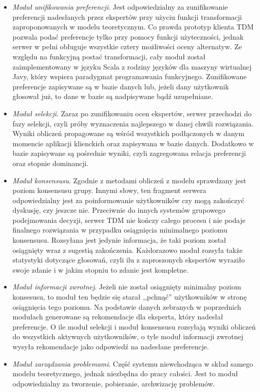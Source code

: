 \begin{itemize}
  \item \emph{Moduł unifikowania preferencji}. Jest odpowiedzialny za
  zunifikowanie preferencji nadesłanych przez ekspertów przy użyciu funkcji
  transformacji zaproponowanych w modelu teoretycznym. Co prawda prototyp
  klienta TDM pozwala podać preferencje tylko przy pomocy funkcji użyteczności,
  jednak serwer w pełni obługuje wszystkie cztery możliwości oceny alternatyw.
  Ze względu na funkcyjną postać transformacji, cały moduł został
  zaimplementowany w języku Scala z rodziny języków dla maszyny wirtualnej Javy,
  który wspiera paradygmat programawania funkcyjnego. Zunifikowane preferencje
  zapisywane są w bazie danych lub, jeżeli dany użytkownik głosował już, to dane
  w bazie są nadpisywane bądź uzupełniane.

  \item \emph{Moduł selekcji}. Zaraz po zunifikowaniu ocen ekspertów, serwer
  przechodzi do fazy selekcji, czyli próby wyznaczenia najlepszego w danej
  chwili rozwiązania. Wyniki obliczeń propagowane są wśród wszystkich
  podłączonych w danym momencie aplikacji klienckich oraz zapisywana w bazie
  danych. Dodatkowo w bazie zapisywane są pośrednie wyniki, czyli zagregowana
  relacja preferencji oraz stopnie dominancji.

  \item \emph{Moduł konsensusu}. Zgodnie z metodami obliczeń z modelu
  sprawdzany jest poziom konsensusu grupy. Innymi słowy, ten fragment serwera
  odpowiedzialny jest za poinformowanie użytkowników czy mogą zakończyć
  dyskusję, czy jeszcze nie. Przeciwnie do innych systemów grupowego
  podejmowania decyzji, serwer TDM nie kończy całego procesu i nie podaje
  finalnego rozwiązania w przypadku osiągnięcia minimalnego poziomu konsensusu.
  Rozsyłana jest jedynie informacja, że taki poziom został osiągnięty wraz z
  sugestią zakończenia. Każdorazowo moduł rozsyła także statystyki dotyczące
  głosowań, czyli ilu z zaproszonych ekspertów wyraziło swoje zdanie i w jakim
  stopniu to zdanie jest kompletne.

  \item \emph{Moduł informacji zwrotnej}. Jeżeli nie został osiągnięty minimalny
  poziom konsesusu, to moduł ten będzie się starał ,,pchnąć'' użytkowników w
  stronę osiągnięcia tego poziomu. Na podstawie danych zebranych w poprzednich
  modułach generowane są rekomendacje dla eksperta, który nadesłał preferencje.
  O ile moduł selekcji i moduł konsensusu rozsyłają wyniki obliczeń do
  wszystkich aktywnych użytkowników, o tyle moduł informacji zwrotnej wysyła
  rekomendacje jako odpowiedź na nadesłane preferencje.

  \item \emph{Moduł zarządzania problemami}. Część systemu niewchodząca w skład
  samego modelu teoretycznego, jednak niezbędna do pracy całości. Jest to moduł
  odpowiedzialny za tworzenie, pobieranie, archwizację problemów. 
   
\end{itemize}

